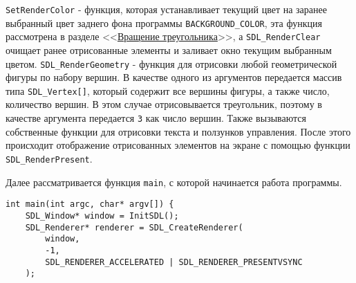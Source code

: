 \documentclass[14pt]{extarticle}
\begin{document}
{\begin{center}
    \end{center}
    
    \begin{spacing}{1.5}
        \verb|SetRenderColor| - функция, которая устанавливает текущий цвет на заранее выбранный цвет заднего фона программы \verb|BACKGROUND_COLOR|, эта функция рассмотрена в разделе <<\hyperref[sec:setcolor]{Вращение треугольника}>>, а \verb|SDL_RenderClear| очищает ранее отрисованные элементы и заливает окно текущим выбранным цветом. \verb|SDL_RenderGeometry| - функция для отрисовки любой геометрической фигуры по набору вершин. В качестве одного из аргументов передается массив типа \verb|SDL_Vertex[]|, который содержит все вершины фигуры, а также число, количество вершин. В этом случае отрисовывается треугольник, поэтому в качестве аргумента передается \verb|3| как число вершин. Также вызываются собственные функции для отрисовки текста и ползунков управления. После этого происходит отображение отрисованных элементов на экране с помощью функции \verb|SDL_RenderPresent|.
        \par
        Далее рассматривается функция \verb|main|, с которой начинается работа программы.
    \end{spacing}

    \begin{lstlisting}
int main(int argc, char* argv[]) {
    SDL_Window* window = InitSDL();
    SDL_Renderer* renderer = SDL_CreateRenderer(
    	window,
    	-1,
    	SDL_RENDERER_ACCELERATED | SDL_RENDERER_PRESENTVSYNC
    );
    

\end{lstlisting}}
\end{document}
